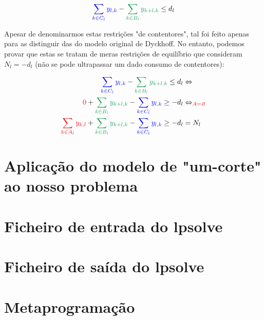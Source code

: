 \documentclass[12pt, a4paper, titlepage]{article}
\begin{document}
\begin{equation}
    {\color{blue} \sum_{k \in C_l} y_{l,k}} -
    {\color{ForestGreen} \sum_{k \in B_l} y_{k + l, k}} \leq d_l
    \label{eq:container-restriction}
\end{equation}

Apesar de denominarmos estas restrições "de contentores"{}, tal foi feito apenas para as distinguir
das do modelo original de Dyckhoff. No entanto, podemos provar que estas se tratam de meras
restrições de equilíbrio que consideram $N_l = -d_l$ (não se pode ultrapassar um dado consumo de
contentores):

\begin{equation}
    \begin{split}
        \nonumber
        {\color{blue} \sum_{k \in C_l} y_{l,k}} -
        {\color{ForestGreen} \sum_{k \in B_l} y_{k + l, k}} \leq d_l
        & \Leftrightarrow \\
        \nonumber
        {\color{red} 0} +
        {\color{ForestGreen} \sum_{k \in B_l} y_{k + l, k}} -
        {\color{blue} \sum_{k \in C_l} y_{l,k}} \geq - d_l
        & \Leftrightarrow_{\color{red} A = \varnothing} \\
        \nonumber
        {\color{red} \sum_{k \in A_l} y_{k, l}} +
        {\color{ForestGreen} \sum_{k \in B_l} y_{k + l, k}} -
        {\color{blue} \sum_{k \in C_l} y_{l,k}} \geq - d_l & = N_l
    \end{split}
\end{equation}

\section{Aplicação do modelo de "um-corte"{} ao nosso problema}


\section{Ficheiro de entrada do lpsolve}


\section{Ficheiro de saída do lpsolve}


\section{Metaprogramação}
\end{document}
